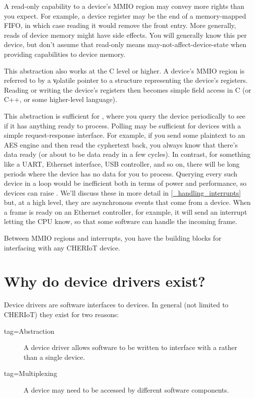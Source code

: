 \begin{caution}
A read-only capability to a device's MMIO region may convey more rights than you expect.
For example, a device register may be the end of a memory-mapped FIFO, in which case reading it would remove the front entry.
More generally, reads of device memory might have side effects.
You will generally know this per device, but don't assume that read-only means may-not-affect-device-state when providing capabilities to device memory.
\end{caution}

This abstraction also works at the C level or higher.
A device's MMIO region is referred to by a \c{volatile} pointer to a structure representing the device's registers.
Reading or writing the device's registers then becomes simple field access in C (or C++, or some higher-level language).

This abstraction is sufficient for , where you query the device periodically to see if it has anything ready to process.
Polling may be sufficient for devices with a simple request-response interface.
For example, if you send some plaintext to an AES engine and then read the cyphertext back, you always know that there's data ready (or about to be data ready in a few cycles).
In contrast, for something like a UART, Ethernet interface, USB controller, and so on, there will be long periods where the device has no data for you to process.
Querying every such device in a loop would be inefficient both in terms of power and performance, so devices can raise .
We'll discuss these in more detail in \ref{_handling_interrupts} but, at a high level, they are asynchronous events that come from a device.
When a frame is ready on an Ethernet controller, for example, it will send an interrupt letting the CPU know, so that some software can handle the incoming frame.

Between MMIO regions and interrupts, you have the building blocks for interfacing with any CHERIoT device.

\section{Why do device drivers exist?}

Device drivers are software interfaces to devices.
In general (not limited to CHERIoT) they exist for two reasons:

\begin{description}
	\item[tag=Abstraction]{ A device driver allows software to be written to interface with a  rather than a single device.}
	\item[tag=Multiplexing]{ A device may need to be accessed by different software components.}
\end{description}


